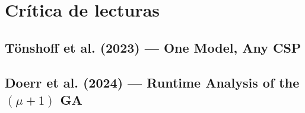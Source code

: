 \section{Cr\'itica de lecturas}

\subsection{T\"onshoff et al. (2023) --- One Model, Any CSP \cite{tonshoff2023onemodel}}

\subsection{Doerr et al. (2024) --- Runtime Analysis of the $(\mu+1)$ GA \cite{doerr2024runtime}}

